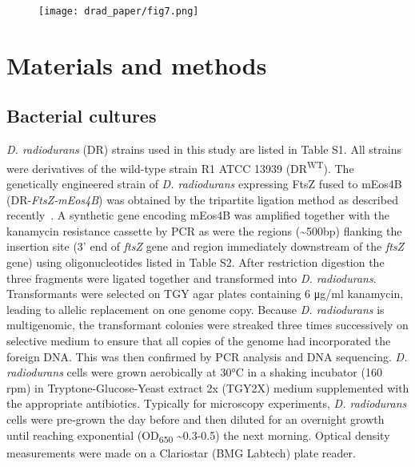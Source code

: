 \begin{figure}
    \centering
    \texttt{[image: drad\_paper/fig7.png]}
    \label{drad_fig7}
\end{figure}

\section{Materials and methods}

\subsection{Bacterial cultures}

\textit{D. radiodurans} (DR) strains used in this study are listed in Table S1.
All strains were derivatives of the wild-type strain R1 ATCC 13939 (DR\textsuperscript{WT}).
The genetically engineered strain of \textit{D. radiodurans} expressing FtsZ fused to mEos4B (DR-\textit{FtsZ-mEos4B}) was obtained by the tripartite ligation method as described recently~\cite{vauclareStressinducedNucleoidRemodeling2024}.
A synthetic gene encoding mEos4B was amplified together with the kanamycin resistance cassette by PCR as were the regions (\sim500bp) flanking the insertion site (3' end of \textit{ftsZ} gene and region immediately downstream of the \textit{ftsZ} gene) using oligonucleotides listed in Table S2.
After restriction digestion the three fragments were ligated together and transformed into \textit{D. radiodurans}.
Transformants were selected on TGY agar plates containing 6 μg/ml kanamycin, leading to allelic replacement on one genome copy.
Because \textit{D. radiodurans} is multigenomic, the transformant colonies were streaked three times successively on selective medium to ensure that all copies of the genome had incorporated the foreign DNA.
This was then confirmed by PCR analysis and DNA sequencing.
\textit{D. radiodurans} cells were grown aerobically at 30°C in a shaking incubator (160 rpm) in Tryptone-Glucose-Yeast extract 2x (TGY2X) medium supplemented with the appropriate antibiotics.
Typically for microscopy experiments, \textit{D. radiodurans} cells were pre-grown the day before and then diluted for an overnight growth until reaching exponential (OD\textsubscript{650} \sim0.3-0.5) the next morning.
Optical density measurements were made on a Clariostar (BMG Labtech) plate reader.

